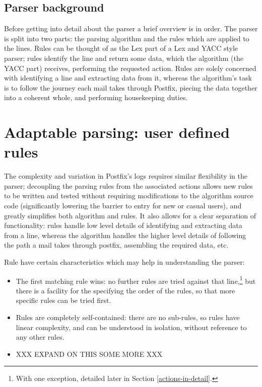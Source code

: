 \documentclass[a4paper,12pt,draft]{article}
\begin{document}
\subsection{Parser background}

Before getting into detail about the parser a brief overview is in order.
The parser is split into two parts: the parsing algorithm and the rules
which are applied to the lines.  Rules can be thought of as the Lex part of
a Lex and YACC style parser; rules identify the line and return some data,
which the algorithm (the YACC part) receives, performing the requested
action.  Rules are solely concerned with identifying a line and extracting
data from it, whereas the algorithm's task is to follow the journey each
mail takes through Postfix, piecing the data together into a coherent
whole, and performing housekeeping duties.


\section{Adaptable parsing: user defined rules}

The complexity and variation in Postfix's logs requires similar flexibility
in the parser; decoupling the parsing rules from the associated actions
allows new rules to be written and tested without requiring modifications
to the algorithm source code (significantly lowering the barrier to entry
for new or casual users), and greatly simplifies both algorithm and rules.
It also allows for a clear separation of functionality: rules handle low
level details of identifying and extracting data from a line, whereas the
algorithm handles the higher level details of following the path a mail
takes through postfix, assembling the required data, etc.

Rule have certain characteristics which may help in understanding the
parser:

\begin{itemize}

    \item The first matching rule wins: no further rules are tried against
        that line,\footnote{With one exception, detailed later in Section
        \ref{actions-in-detail}.} but there is a facility for the
        specifying the order of the rules, so that more specific rules can
        be tried first.

    \item Rules are completely self-contained: there are no sub-rules, so
        rules have linear complexity, and can be understood in isolation,
        without reference to any other rules.

    \item XXX EXPAND ON THIS SOME MORE XXX

\end{itemize}
\end{document}

